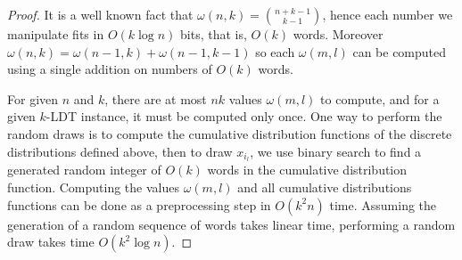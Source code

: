 \begin{proof}
	It is a well known fact that $\omega(n,k)=\binom{n+k-1}{k-1}$, hence each
	number we manipulate fits in $O(k \log n)$ bits, that is, $O(k)$ words.
	Moreover $\omega(n,k) = \omega(n-1,k) + \omega(n-1,k-1)$ so each
	$\omega(m,l)$ can be computed using a single addition on numbers of $O(k)$
	words.

	For given $n$ and $k$, there are at most $nk$ values $\omega(m,l)$ to
	compute, and for a given $k$-LDT instance, it must be computed only once.
	One way to perform the random draws is to compute the cumulative
	distribution functions of the discrete distributions defined above, then to
	draw $x_{i_l}$, we use binary search to find a generated random integer of
	$O(k)$ words in the cumulative distribution function. Computing the
	values $\omega(m,l)$ and all cumulative distributions functions can be done
	as a preprocessing step in $O(k^2 n)$ time. Assuming the generation
	of a random sequence of words takes linear time, performing a random draw
	takes time $O(k^2 \log n)$.

\end{proof}

